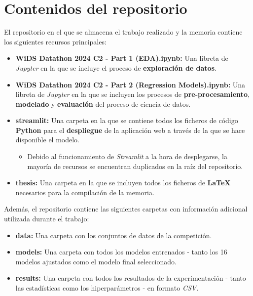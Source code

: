 \chapter{Contenidos del repositorio}

El repositorio en el que se almacena el trabajo realizado y la memoria contiene los siguientes recursos principales:

\begin{itemize}[leftmargin=*]
	\item \textbf{WiDS Datathon 2024 C2 - Part 1 (EDA).ipynb:} Una libreta de \textit{Jupyter} en la que se incluye el proceso de \textbf{exploración de datos}.
	\item \textbf{WiDS Datathon 2024 C2 - Part 2 (Regression Models).ipynb:} Una libreta de \textit{Jupyter} en la que se incluyen los procesos de \textbf{pre-procesamiento}, \textbf{modelado} y \textbf{evaluación} del proceso de ciencia de datos.
	\item \textbf{streamlit:} Una carpeta en la que se contiene todos los ficheros de código \textbf{Python} para el \textbf{despliegue} de la aplicación web a través de la que se hace disponible el modelo.
	\begin{itemize}
		\item Debido al funcionamiento de \textit{Streamlit} a la hora de desplegarse, la mayoría de recursos se encuentran duplicados en la raíz del repositorio.
	\end{itemize}
	\item  \textbf{thesis:} Una carpeta en la que se incluyen todos los ficheros de \textbf{LaTeX} necesarios para la compilación de la memoria.
		
		
\end{itemize}

Además, el repositorio contiene las siguientes carpetas con información adicional utilizada durante el trabajo:

\begin{itemize}[leftmargin=*]
	\item \textbf{data:} Una carpeta con los conjuntos de datos de la competición.
	\item \textbf{models:} Una carpeta con todos los modelos entrenados - tanto los 16 modelos ajustados como el modelo final seleccionado.
	\item \textbf{results:} Una carpeta con todos los resultados de la experimentación - tanto las estadísticas como los hiperparámetros - en formato \textit{CSV}.
\end{itemize}